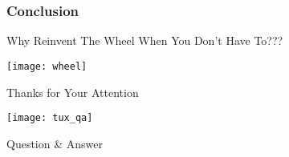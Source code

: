 \section{}

\begin{frame}

\frametitle{Conclusion}

    Why Reinvent The Wheel When You Don't Have To???
    
     \texttt{[image: wheel]}
  
\end{frame}


\begin{frame}{Thanks for Your Attention}


\centering
\texttt{[image: tux\_qa]}

\centering
Question \& Answer

\end{frame}

